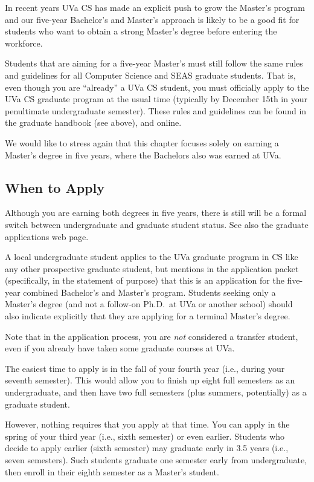 In recent years UVa CS has made an explicit push to grow the Master's
program and our five-year Bachelor's and Master's approach is likely to
be a good fit for students who want to obtain a strong Master's degree 
before entering the workforce. 

Students that are aiming for a five-year Master's must still follow the
same rules and guidelines for all Computer Science and SEAS graduate
students. That is, even though you are ``already'' a UVa CS student, you
must officially apply to the UVa CS graduate program at the usual time
(typically by December 15th in your penultimate undergraduate semester). 
These rules and guidelines can be found in the graduate handbook (see
above), and
online.

We would like to stress again that this chapter focuses solely on
earning a Master's degree in five years, where the Bachelors also was
earned at UVa.

\subsection{When to Apply}

Although you are earning both degrees in five years, there is still will
be a formal switch between undergraduate and graduate student status.
See also the graduate applications web
page.

A local undergraduate student applies to the UVa graduate program in CS
like any other prospective graduate student, but mentions in the
application packet (specifically, in the statement of purpose) that 
this is an application for the five-year combined Bachelor's and Master's
program. Students seeking only a Master's degree (and not a follow-on
Ph.D.\ at UVa or another school) should also indicate explicitly that they
are applying for a terminal Master's degree. 

Note that in the application process, you are \emph{not} considered a
transfer student, even if you already have taken some graduate courses at
UVa.

The easiest time to apply is in the fall of your fourth year (i.e., during
your seventh semester).  This would allow you to finish up eight full
semesters as an undergraduate, and then have two full semesters (plus
summers, potentially) as a graduate student.

However, nothing requires that you apply at that time.  You can apply
in the spring of your third year (i.e., sixth semester) or even earlier.
Students who decide to apply earlier (sixth semester) may graduate
early in 3.5 years (i.e., seven semesters). Such students graduate one
semester early from undergraduate, then enroll in their eighth semester
as a Master's student.

